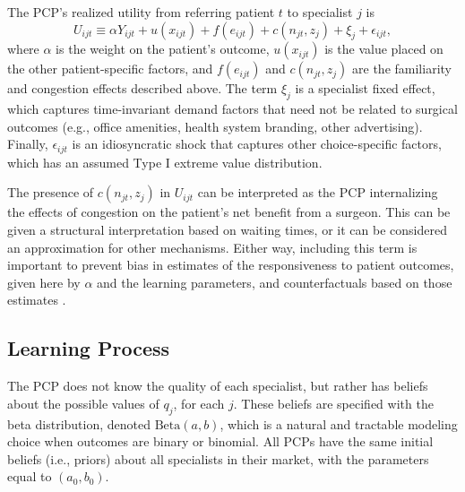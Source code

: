\documentclass[12pt]{article}
\begin{document}
The PCP's realized utility from referring patient $t$ to specialist $j$ is
\begin{equation}
U_{ijt} \equiv \alpha Y_{ijt} + u(x_{ijt}) + f(e_{ijt}) + c(n_{jt}, z_j) + \xi_j + \epsilon_{ijt},
\label{eqn:pcp_utility}
\end{equation}
where $\alpha$ is the weight on the patient's outcome, $u(x_{ijt})$ is the value placed on the other patient-specific factors, and $f(e_{ijt})$ and $c(n_{jt}, z_j)$ are the familiarity and congestion effects described above. The term $\xi_{j}$ is a specialist fixed effect, which captures time-invariant demand factors that need not be related to surgical outcomes (e.g., office amenities, health system branding, other advertising). Finally, $\epsilon_{ijt}$ is an idiosyncratic shock that captures other choice-specific factors, which has an assumed Type I extreme value distribution.

The presence of $c(n_{jt}, z_j)$ in $U_{ijt}$ can be interpreted as the PCP internalizing the effects of congestion on the patient's net benefit from a surgeon. This can be given a structural interpretation based on waiting times, or it can be considered an approximation for other mechanisms. Either way, including this term is important to prevent bias in estimates of the responsiveness to patient outcomes, given here by $\alpha$ and the learning parameters, and counterfactuals based on those estimates \citep[see][]{richards-shubik2021}.

\subsection{Learning Process}
\label{sec:learning}

The PCP does not know the quality of each specialist, but rather has beliefs about the possible values of $q_j$, for each $j$. These beliefs are specified with the beta distribution, denoted $\mathrm{Beta}(a, b)$, which is a natural and tractable modeling choice when outcomes are binary or binomial. All PCPs have the same initial beliefs (i.e., priors) about all specialists in their market, with the parameters equal to $(a_0, b_0)$.
\end{document}
